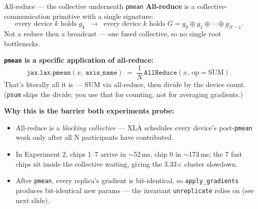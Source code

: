\documentclass[aspectratio=169,10pt]{beamer}
\begin{document}
\begin{frame}{All-reduce — the collective underneath \texttt{pmean}}
  \textbf{All-reduce} is a collective-communication primitive with a single signature:
  \[
    \text{every device } k \text{ holds } g_k \;\;\longrightarrow\;\;
    \text{every device } k \text{ holds } G = g_0 \oplus g_1 \oplus \cdots \oplus g_{N-1}.
  \]
  Not a reduce then a broadcast — one fused collective, so no single root bottlenecks.

  \vspace{0.6em}
  \textbf{\texttt{pmean} is a specific application of all-reduce:}
  \[
    \mathtt{jax.lax.pmean}(x,\ \mathtt{axis\_name}) \;=\;
    \frac{1}{N}\,\mathtt{AllReduce}(x,\ \mathrm{op}=\mathrm{SUM}).
  \]
  That's literally all it is — SUM via all-reduce, then divide by the device count.
  (\texttt{psum} skips the divide; you use that for counting, not for averaging gradients.)

  \vspace{0.6em}
  \textbf{Why this is the barrier both experiments probe:}
  \begin{itemize}\small
    \item All-reduce is a \emph{blocking collective} — XLA schedules every device's
          post-\texttt{pmean} work only after all N participants have contributed.
    \item In Experiment 2, chips 1–7 arrive in $\sim$52\,ms, chip 0 in $\sim$173\,ms;
          the 7 fast chips sit inside the collective waiting, giving the 3.33$\times$ cluster slowdown.
    \item After \texttt{pmean}, every replica's gradient is bit-identical, so
          \texttt{apply\_gradients} produces bit-identical new params — the invariant
          \texttt{unreplicate} relies on (see next slide).
  \end{itemize}
\end{frame}
\end{document}
